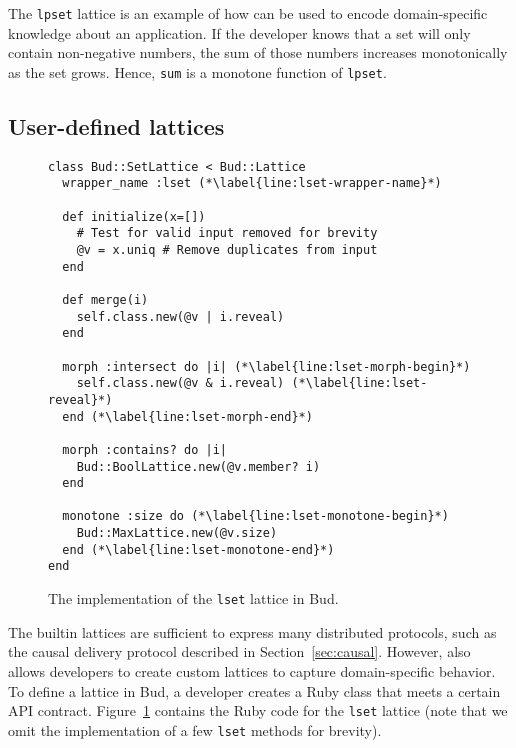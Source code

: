 The \texttt{lpset} lattice is an example of how \lang can be used to encode
domain-specific knowledge about an application. If the developer knows that a
set will only contain non-negative numbers, the sum of those numbers increases
monotonically as the set grows. Hence, \texttt{sum} is a monotone function of
\texttt{lpset}.%

\subsection{User-defined lattices}
\begin{figure}[t]
\begin{scriptsize}
\begin{lstlisting}[deletekeywords={lset}]
class Bud::SetLattice < Bud::Lattice
  wrapper_name :lset (*\label{line:lset-wrapper-name}*)

  def initialize(x=[])
    # Test for valid input removed for brevity
    @v = x.uniq # Remove duplicates from input
  end

  def merge(i)
    self.class.new(@v | i.reveal)
  end

  morph :intersect do |i| (*\label{line:lset-morph-begin}*)
    self.class.new(@v & i.reveal) (*\label{line:lset-reveal}*)
  end (*\label{line:lset-morph-end}*)

  morph :contains? do |i|
    Bud::BoolLattice.new(@v.member? i)
  end

  monotone :size do (*\label{line:lset-monotone-begin}*)
    Bud::MaxLattice.new(@v.size)
  end (*\label{line:lset-monotone-end}*)
end
\end{lstlisting}
\end{scriptsize}
\caption{The implementation of the \texttt{lset} lattice in Bud.}
\label{fig:lattice-lset}
\end{figure}

\label{sec:lattice-api}
The builtin lattices are sufficient to express many distributed protocols, such
as the causal delivery protocol described in Section~\ref{sec:causal}. However,
\lang also allows developers to create custom lattices to capture
domain-specific behavior. To define a lattice in Bud, a developer creates a Ruby
class that meets a certain API contract. Figure~\ref{fig:lattice-lset} contains
the Ruby code for the \texttt{lset} lattice (note that we omit the
implementation of a few \texttt{lset} methods for brevity).

